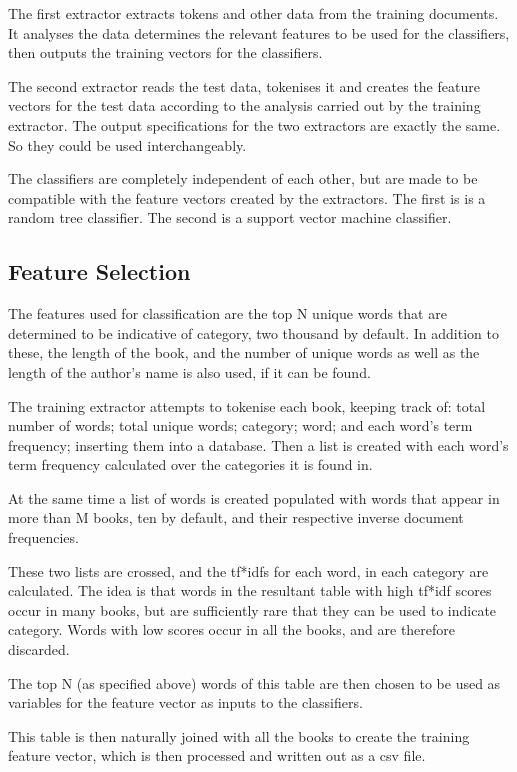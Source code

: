 \documentclass[11pt]{article}
\begin{document}
The first extractor extracts tokens and other data from the training documents.
It analyses the data determines the relevant features to be used for the
classifiers, then outputs the training vectors for the classifiers. 

The second extractor reads the test data, tokenises it and creates the feature
vectors for the test data according to the analysis carried out by the training
extractor. The output specifications for the two extractors are exactly the
same. So they could be used interchangeably.

The classifiers are completely independent of each other, but are made to be
compatible with the feature vectors created by the extractors. The first is is a
random tree classifier. The second is a support vector machine classifier.

\subsection{Feature Selection}

The features used for classification are the top N unique words that are
determined to be indicative of category, two thousand by default. In
addition to these, the length of the book, and the number of unique words as
well as the length of the author's name is also used, if it can be found. 

The training extractor attempts to tokenise each book, keeping track of: total
number of words; total unique words; category; word; and each word's term
frequency; inserting them into a database. Then a list is created with each
word's term frequency calculated over the categories it is found in.

At the same time a list of words is created populated with words that appear in
more than M books, ten by default, and their respective inverse document
frequencies. 

These two lists are crossed, and the tf*idfs for each word, in each category are
calculated. The idea is that words in the resultant table with high tf*idf
scores occur in many books, but are sufficiently rare that they can be used to
indicate category. Words with low scores occur in all the books, and are
therefore discarded.

The top N (as specified above) words of this table are then chosen to be used as
variables for the feature vector as inputs to the classifiers.

This table is then naturally joined with all the books to create the training
feature vector, which is then processed and written out as a csv file.
\end{document}
